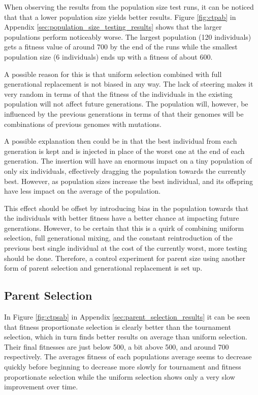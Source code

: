 When observing the results from the population size test runs, it can be noticed that that a lower population size yields better results. Figure \ref{fig:ctpab} in Appendix \ref{sec:population_size_testing_results} shows that the larger populations perform noticeably worse. The largest population (120 individuals) gets a fitness value of around 700 by the end of the runs while the smallest population size (6 individuals) ends up with a fitness of about 600.

A possible reason for this is that uniform selection combined with full generational replacement is not biased in any way. The lack of steering makes it very random in terms of that the fitness of the individuals in the existing population will not affect future generations. The population will, however, be influenced by the previous generations in terms of that their genomes will be combinations of previous genomes with mutations.

A possible explanation then could be in that the best individual from each generation is kept and is injected in place of the worst one at the end of each generation. The insertion will have an enormous impact on a tiny population of only six individuals, effectively dragging the population towards the currently best. However, as population sizes increase the best individual, and its offspring have less impact on the average of the population.

This effect should be offset by introducing bias in the population towards that the individuals with better fitness have a better chance at impacting future generations. However, to be certain that this is a quirk of combining uniform selection, full generational mixing, and the constant reintroduction of the previous best single individual at the cost of the currently worst, more testing should be done. Therefore, a control experiment for parent size using another form of parent selection and generational replacement is set up.

\subsection{Parent Selection} %
\label{sub:parent_selection}

In Figure \ref{fig:ctpsab} in Appendix \ref{sec:parent_selection_results} it can be seen that fitness proportionate selection is clearly better than the tournament selection, which in turn finds better results on average than uniform selection. Their final fitnesses are just below 500, a bit above 500, and around 700 respectively. The averages fitness of each populations average seems to decrease quickly before beginning to decrease more slowly for tournament and fitness proportionate selection while the uniform selection shows only a very slow improvement over time.

